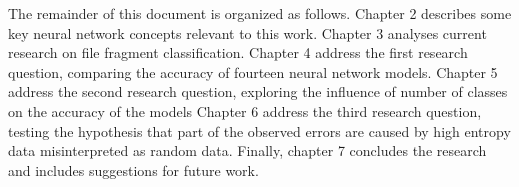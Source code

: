 
The remainder of this document is organized as follows.
    Chapter 2 describes some key neural network concepts relevant to this work. 
    Chapter 3 analyses current research on file fragment classification.
    Chapter 4 address the first research question, comparing the accuracy of fourteen neural network models.
    Chapter 5 address the second research question, exploring the influence of number of classes on the accuracy of the models
    Chapter 6 address the third research question, testing the hypothesis that part of the observed errors are caused by high entropy data misinterpreted as random data.    
    Finally, chapter 7 concludes the research and includes suggestions for future work.
    